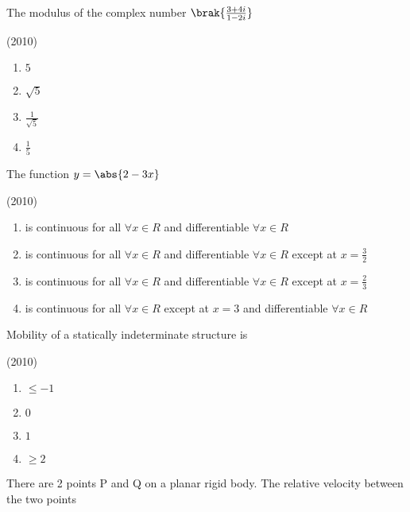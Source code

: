     \item The modulus of the complex number $\brak{\frac{3+4i}{1-2i}}$
    
    \hfill{(2010)}
    
		\begin{multicols}{4}
			\begin{enumerate}
				\item $5$
				\item $\sqrt{5}$
				\item $\frac{1}{\sqrt{5}}$
				\item $\frac{1}{5}$
			\end{enumerate}
		\end{multicols}

    \item The function $y=\abs{2-3x}$
    
    \hfill{(2010)}

       \begin{enumerate}
            \item is continuous for all $\forall x\in R$ and differentiable $\forall x\in R$
            \item is continuous for all $\forall x\in R$ and differentiable $\forall x\in R$ except at $x=\frac{3}{2}$
            \item is continuous for all $\forall x\in R$ and differentiable $\forall x\in R$ except at $x=\frac{2}{3}$
            \item is continuous for all $\forall x\in R$ except at $x=3$ and differentiable $\forall x\in R$
        \end{enumerate}
  
    \item Mobility of a statically indeterminate structure is
    
    \hfill{(2010)}

    \begin{multicols}{4}
        \begin{enumerate}
            \item $\leq -1$
            \item $0$
            \item $1$
            \item $\geq2$
        \end{enumerate}
    \end{multicols}

    \item There are 2 points P and Q on a planar rigid body. The relative velocity between the two points 
    
